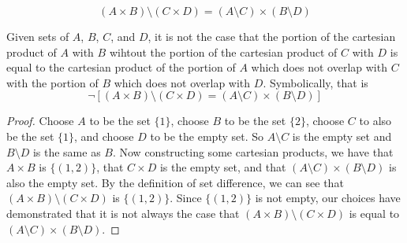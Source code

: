 \documentclass[main.tex]{subfiles}
\begin{document}
\subproblem{}\label{2q}
\[(A \times B) \setminus (C \times D) = (A \setminus C) \times (B \setminus D)\]
\begin{thm}
	Given sets of \(A\), \(B\), \(C\), and \(D\), it is not the case that
	the portion of the cartesian product of \(A\) with \(B\) wihtout the
	portion of the cartesian product of \(C\) with \(D\) is equal to the
	cartesian product of the portion of \(A\) which does not overlap with
	\(C\) with the portion of \(B\) which does not overlap with \(D\).
	Symbolically, that is
	\[\neg [(A \times B) \setminus (C \times D) = (A \setminus C) \times (B \setminus D)]\]
\end{thm}
\begin{proof}
	Choose \(A\) to be the set \(\{1\}\), choose \(B\) to be the set
	\(\{2\}\), choose \(C\) to also be the set \(\{1\}\), and choose \(D\)
	to be the empty set. So \(A \setminus C\) is the empty set and
	\(B \setminus D\) is the same as \(B\). Now constructing some cartesian
	products, we have that \(A \times B\) is \(\{(1,2)\}\), that
	\(C \times D\) is the empty set, and that
	\((A \setminus C) \times (B \setminus D)\) is also the empty set. By the
	definition of set difference, we can see that
	\((A \times B) \setminus (C \times D)\) is \(\{(1,2)\}\). Since
	\(\{(1,2)\}\) is not empty, our choices have demonstrated that it is not
	always the case that \((A \times B) \setminus (C \times D)\) is equal to
	\((A \setminus C) \times (B \setminus D)\).
\end{proof}
\end{document}
